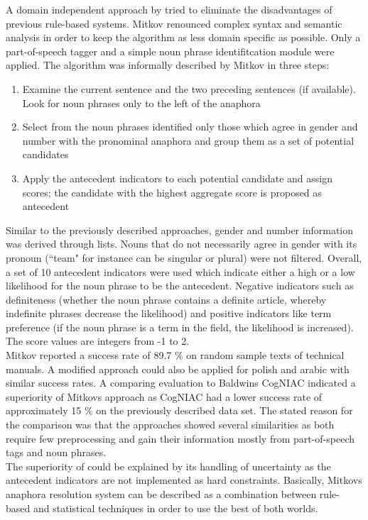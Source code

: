 A domain independent approach by \cite{mitkov1998robust} tried to eliminate the disadvantages of previous rule-based systems. Mitkov renounced complex syntax and semantic analysis in order to keep the algorithm as less domain specific as possible. Only a part-of-speech tagger and a simple noun phrase identifitcation module were applied. The algorithm was informally described by Mitkov in three steps:
\begin{enumerate} 
\item Examine the current sentence and the two preceding sentences (if available). Look for noun phrases only to the left of the anaphora
\item Select from the noun phrases identified only those which agree in gender and number with the pronominal anaphora and group them as a set of potential candidates
\item Apply the antecedent indicators to each potential candidate and assign scores; the candidate with the highest aggregate score is proposed as antecedent
\end{enumerate}
Similar to the previously described approaches, gender and number information was derived through lists. Nouns that do not necessarily agree in gender with its pronoun (``team" for instance can be singular or plural) were not filtered.
Overall, a set of 10 antecedent indicators were used which indicate either a high or a low likelihood for the noun phrase to be the antecedent. Negative indicators such as definiteness (whether the noun phrase contains a definite article, whereby indefinite phrases decrease the likelihood) and positive indicators like term preference (if the noun phrase is a term in the field, the likelihood is increased). The score values are integers from -1 to 2. \\
Mitkov reported a success rate of 89.7 \% on random sample texts of technical manuals. A modified approach could also be applied for polish \citep{mitkov2000robust} and arabic \citep{mitkov1998multilingual} with similar success rates.
A comparing evaluation to Baldwins CogNIAC \citep{baldwin1997cogniac} indicated a superiority of Mitkovs approach \citep{mitkov1998robust} as CogNIAC had a lower success rate of approximately 15 \% on the previously described data set. The stated reason for the comparison was that the approaches showed several similarities as both require few preprocessing and gain their information mostly from part-of-speech tags and noun phrases.\\
The superiority of \citep{mitkov1998robust} could be explained by its handling of uncertainty as the antecedent indicators are not implemented as hard constraints. Basically, Mitkovs anaphora resolution system can be described as a combination between rule-based and statistical techniques in order to use the best of both worlds.
